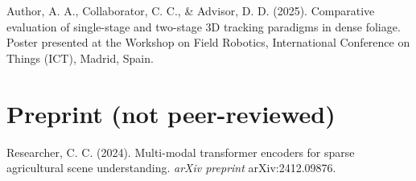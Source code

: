 Author, A. A., Collaborator, C. C., \& Advisor, D. D. (2025). Comparative evaluation of single-stage and two-stage 3D tracking paradigms in dense foliage. Poster presented at the Workshop on Field Robotics, International Conference on Things (ICT), Madrid, Spain.

\section*{Preprint (not peer-reviewed)}

Researcher, C. C. (2024). Multi-modal transformer encoders for sparse agricultural scene understanding. \textit{arXiv preprint} arXiv:2412.09876.